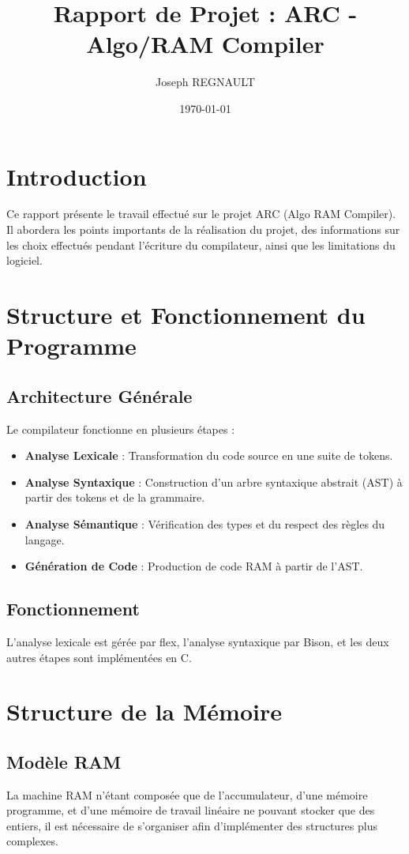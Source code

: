 \documentclass[a4paper,12pt]{article}
\title{Rapport de Projet : ARC - Algo/RAM Compiler}
\author{Joseph REGNAULT}
\date{\today}
\begin{document}
\maketitle

\tableofcontents

\newpage

\section{Introduction}
Ce rapport présente le travail effectué sur le projet ARC (Algo RAM Compiler). Il abordera les points importants de la réalisation du projet, des informations sur les choix effectués pendant l'écriture du compilateur, ainsi que les limitations du logiciel.

\section{Structure et Fonctionnement du Programme}

\subsection{Architecture Générale}
Le compilateur fonctionne en plusieurs étapes :
\begin{itemize}
    \item \textbf{Analyse Lexicale} : Transformation du code source en une suite de tokens.
    \item \textbf{Analyse Syntaxique} : Construction d'un arbre syntaxique abstrait (AST) à partir des tokens et de la grammaire.
    \item \textbf{Analyse Sémantique} : Vérification des types et du respect des règles du langage.
    \item \textbf{Génération de Code} : Production de code RAM à partir de l'AST.
\end{itemize}

\subsection{Fonctionnement}
L'analyse lexicale est gérée par flex, l'analyse syntaxique par Bison, et les deux autres étapes sont implémentées en C.

\section{Structure de la Mémoire}

\subsection{Modèle RAM}
La machine RAM n'étant composée que de l'accumulateur, d'une mémoire programme, et d'une mémoire de travail linéaire ne pouvant stocker que des entiers, il est nécessaire de s'organiser afin d'implémenter des structures plus complexes.
\end{document}
